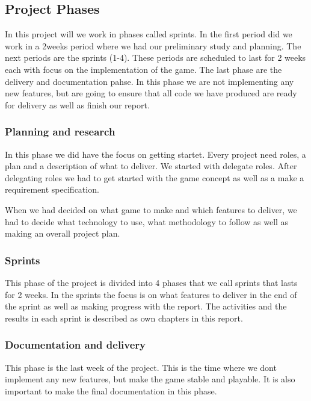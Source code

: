 \subsection{Project Phases}

In this project will we work in phases called sprints.
In the first period did we work in a 2weeks period where we had our preliminary study and planning. The next periods are the sprints (1-4). These periods are scheduled to last for 2 weeks each with focus on the implementation of the game. The last phase are the delivery and documentation pahse. In this phase we are not implementing any new features, but are going to ensure that all code we have produced are ready for delivery as well as finish our report.

\subsubsection{Planning and research}
In this phase we did have the focus on getting startet. Every project need roles, a plan and a description of what to deliver. We started with delegate roles. After delegating roles we had to get started with the game concept as well as a make a requirement specification. 

When we had decided on what game to make and which features to deliver, we had to decide what technology to use, what methodology to follow as well as making an overall project plan. 

\subsubsection{Sprints}
This phase of the project is divided into 4 phases that we call sprints that lasts for 2 weeks.
In the sprints the focus is on what features to deliver in the end of the sprint as well as 
making progress with the report. The activities and the results in each sprint is described as
own chapters in this report.

\subsubsection{Documentation and delivery}
This phase is the last week of the project. This is the time where we dont implement any new features, 
but make the game stable and playable. It is also important to make the final documentation in this phase.

